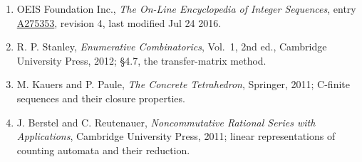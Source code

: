 \documentclass[11pt]{article}
\theoremstyle{definition}
\begin{document}
\begin{enumerate}

\item OEIS Foundation Inc., \emph{The On-Line Encyclopedia of Integer Sequences}, entry \href{https://oeis.org/A275353}{A275353}, revision 4, last modified Jul 24 2016.

\item R. P. Stanley, \emph{Enumerative Combinatorics}, Vol.~1, 2nd ed., Cambridge University Press, 2012; \S4.7, the transfer-matrix method.

\item M. Kauers and P. Paule, \emph{The Concrete Tetrahedron}, Springer, 2011; C-finite sequences and their closure properties.

\item J. Berstel and C. Reutenauer, \emph{Noncommutative Rational Series with Applications}, Cambridge University Press, 2011; linear representations of counting automata and their reduction.

\end{enumerate}
\end{document}
